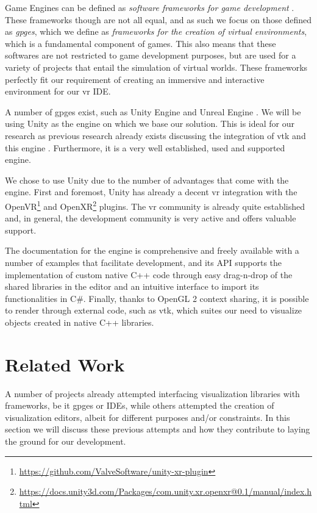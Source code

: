 Game Engines can be defined as \textit{software frameworks for game development} \cite{politowski2021game}. These frameworks though are not all equal, and as such we focus on those defined as \textit{\acrfull{gpge}s}, which we define as \textit{frameworks for the creation of virtual environments}, which is a fundamental component of games. This also means that these softwares are not restricted to game development purposes, but are used for a variety of projects that entail the simulation of virtual worlds. These frameworks perfectly fit our requirement of creating an immersive and interactive environment for our \acrshort{vr} IDE.

A number of \acrshort{gpge}s exist, such as Unity Engine \cite{haas2014history} and Unreal Engine \cite{unrealengine}. We will be using Unity as the engine on which we base our solution. This is ideal for our research as previous research already exists discussing the integration of \acrshort{vtk} and this engine \cite{wheeler_virtual_2018}. Furthermore, it is a very well established, used and supported engine.

We chose to use Unity due to the number of advantages that come with the engine. First and foremost, Unity has already a decent \acrshort{vr} integration with the OpenVR\footnote{\url{https://github.com/ValveSoftware/unity-xr-plugin}} and OpenXR\footnote{\url{https://docs.unity3d.com/Packages/com.unity.xr.openxr@0.1/manual/index.html}} plugins. The \acrshort{vr} community is already quite established and, in general, the development community is very active and offers valuable support. 

The documentation for the engine is comprehensive and freely available with a number of examples that facilitate development, and its API supports the implementation of custom native C++ code through easy drag-n-drop of the shared libraries in the editor and an intuitive interface to import its functionalities in C\#. Finally, thanks to OpenGL 2 context sharing, it is possible to render through external code, such as \acrshort{vtk}, which suites our need to visualize objects created in native C++ libraries.

\section{Related Work}

A number of projects already attempted interfacing visualization libraries with frameworks, be it \acrshort{gpge}s or IDEs, while others attempted the creation of visualization editors, albeit for different purposes and/or constraints. In this section we will discuss these previous attempts and how they contribute to laying the ground for our development.

